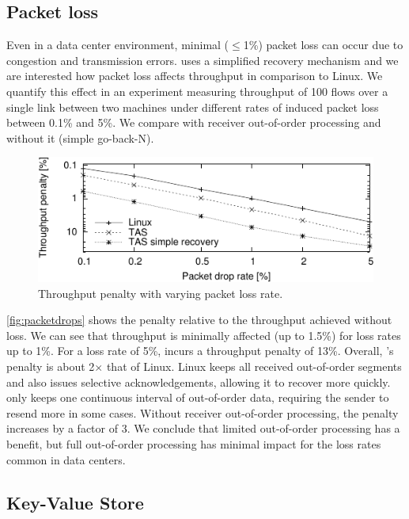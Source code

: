 \subsection{Packet loss}

Even in a data center environment, minimal ($\leq$1\%) packet loss can
occur due to congestion and transmission errors. \rmttcp uses a
simplified recovery mechanism and we are interested how packet loss
affects \rmttcp throughput in comparison to Linux. We quantify this
effect in an experiment measuring throughput of 100 flows over a
single link between two machines under different rates of induced
packet loss between 0.1\% and 5\%. We compare \rmttcp with receiver
out-of-order processing and without it (simple go-back-N).

\begin{figure}
  \centering
  \includegraphics[width=\columnwidth]{plots/drops/throughput.pdf}
  \caption{Throughput penalty with varying packet loss rate.}
  \label{fig:packetdrops}
\end{figure}

\autoref{fig:packetdrops} shows the penalty relative to the throughput
achieved without loss. We can see that \rmttcp throughput is minimally
affected (up to 1.5\%) for loss rates up to 1\%. For a loss rate of
5\%, \rmttcp incurs a throughput penalty of 13\%. Overall, \rmttcp's
penalty is about 2$\times$ that of Linux. Linux keeps all received
out-of-order segments and also issues selective acknowledgements,
allowing it to recover more quickly. \rmttcp only keeps one continuous
interval of out-of-order data, requiring the sender to resend more in
some cases.  Without receiver out-of-order processing, the penalty
increases by a factor of 3. We conclude that limited out-of-order
processing has a benefit, but full out-of-order processing has minimal
impact for the loss rates common in data centers.

\subsection{Key-Value Store}\label{sec:kvstore}

